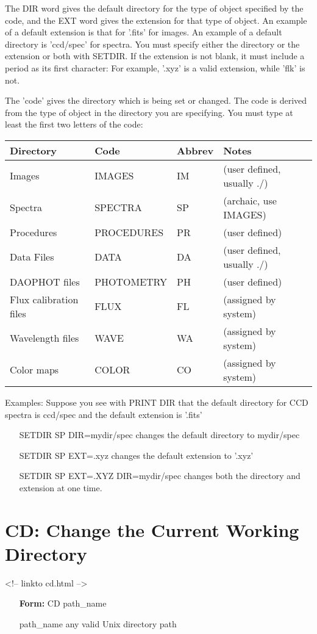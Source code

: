 The DIR word gives the default directory for the type of object specified
by the code, and the EXT word gives the extension for that type of object.
An example of a default extension is that for '.fits' for images.  An
example of a default directory is 'ccd/spec' for spectra.  You must specify
either the directory or the extension or both with SETDIR. If the extension
is not blank, it must include a period as its first character: For example,
'.xyz' is a valid extension, while 'flk' is not.

The 'code' gives the directory which is being set or changed. The code is
derived from the type of object in the directory you are specifying.  You
must type at least the first two letters of the code:

\begin{center}
\begin{tabular}{llll}
Directory&Code&Abbrev&Notes\\
\hline
Images&IMAGES&IM&(user defined, usually ./)\\
Spectra&SPECTRA&SP&(archaic, use IMAGES)\\
Procedures&PROCEDURES&PR&(user defined)\\
Data Files&DATA&DA&(user defined, usually ./)\\
DAOPHOT files&PHOTOMETRY&PH&(user defined)\\
Flux calibration files&FLUX&FL&(assigned by system)\\
Wavelength files&WAVE&WA&(assigned by system)\\
Color maps&COLOR&CO&(assigned by system)\\
\hline
\end{tabular}
\end{center}

Examples: Suppose you see with PRINT DIR that the default directory for CCD
spectra is ccd/spec and the default extension is '.fits'
\begin{itemize}
  \item[SETDIR SP DIR=mydir/spec\hfill]{changes the default directory
       to mydir/spec}
  \item[SETDIR SP EXT=.xyz\hfill]{changes the default extension to '.xyz'}
  \item[SETDIR SP EXT=.XYZ DIR=mydir/spec\hfill]{changes both the
       directory and extension at one time.}
\end{itemize}

\section{CD: Change the Current Working Directory}
\begin{rawhtml}
<!-- linkto cd.html -->
\end{rawhtml}
\begin{itemize} 
  \item[\textbf{Form: } CD path\_name\hfill]{}
  \item[path\_name]{any valid Unix directory path}
\end{itemize}
 
